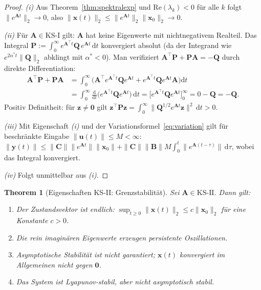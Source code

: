 ﻿\documentclass[12pt, a4paper, titlepage]{report}
\newtheorem{theorem}{Theorem}[section]
\theoremstyle{definition}
\theoremstyle{remark}
\newcommand{\vx}{\bm{x}}
\newcommand{\vu}{\bm{u}}
\newcommand{\vy}{\bm{y}}
\newcommand{\vA}{\bm{A}}
\newcommand{\vB}{\bm{B}}
\newcommand{\vC}{\bm{C}}
\newcommand{\vP}{\bm{P}}
\newcommand{\vQ}{\bm{Q}}
\newcommand{\T}{\top}
\newcommand{\re}{\mathrm{Re}}
\newcommand{\KS}{\mathrm{KS}}
\begin{document}
\begin{proof}
\textit{(i)} Aus Theorem~\ref{thm:spektralexp} und $\re(\lambda_k) < 0$ für alle $k$
folgt $\|e^{\vA t}\|_2 \to 0$, also $\|\vx(t)\|_2 \leq \|e^{\vA t}\|_2 \|\vx_0\|_2 \to 0$.

\textit{(ii)} Für $\vA \in \KS\text{-I}$ gilt: $\vA$ hat keine Eigenwerte mit
nichtnegativem Realteil. Das Integral
$\vP := \int_0^\infty e^{\vA^\T t}\vQ\,e^{\vA t}\,\mathrm{d}t$
konvergiert absolut (da der Integrand wie $e^{2\alpha^* t}\|\vQ\|_2$ abklingt mit
$\alpha^* < 0$). Man verifiziert $\vA^\T\vP + \vP\vA = -\vQ$ durch direkte Differentiation:
\begin{align*}
  \vA^\T\vP + \vP\vA &= \int_0^\infty \bigl(\vA^\T e^{\vA^\T t}\vQ e^{\vA t} + e^{\vA^\T t}\vQ e^{\vA t}\vA\bigr)\mathrm{d}t \\
  &= \int_0^\infty \frac{\mathrm{d}}{\mathrm{d}t}\bigl(e^{\vA^\T t}\vQ e^{\vA t}\bigr)\,\mathrm{d}t
   = \bigl[e^{\vA^\T t}\vQ e^{\vA t}\bigr]_0^\infty = 0 - \vQ = -\vQ.
\end{align*}
Positiv Definitheit: für $\bm{z} \neq \bm{0}$ gilt
$\bm{z}^\T\vP\bm{z} = \int_0^\infty \|{\vQ}^{1/2}e^{\vA t}\bm{z}\|^2\,\mathrm{d}t > 0$.

\textit{(iii)} Mit Eigenschaft \textit{(i)} und der Variationsformel~\eqref{eq:variation}
gilt für beschränkte Eingabe $\|\vu(t)\| \leq M < \infty$:
$\|\vy(t)\| \leq \|\vC\|\|e^{\vA t}\|\|\vx_0\| + \|\vC\|\|\vB\| M \int_0^t \|e^{\vA(t-\tau)}\|\,\mathrm{d}\tau$,
wobei das Integral konvergiert.

\textit{(iv)} Folgt unmittelbar aus \textit{(i)}. \qedhere
\end{proof}

\begin{theorem}[Eigenschaften KS-II: Grenzstabilität]
\label{thm:ks2}
Sei $\vA \in \KS\text{-II}$. Dann gilt:
\begin{enumerate}[label=(\roman*)]
  \item Der Zustandsvektor ist endlich: $\sup_{t\geq 0}\|\vx(t)\|_2 \leq c\|\vx_0\|_2$
    für eine Konstante $c > 0$.
  \item Die rein imaginären Eigenwerte erzeugen persistente Oszillationen.
  \item Asymptotische Stabilität ist nicht garantiert; $\vx(t)$ konvergiert im
    Allgemeinen nicht gegen $\bm{0}$.
  \item Das System ist Lyapunov-stabil, aber nicht asymptotisch stabil.
\end{enumerate}
\end{theorem}
\end{document}
